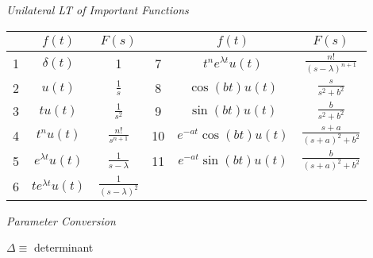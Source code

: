 \documentclass[twocolumn]{article}
\begin{document}
\vspace{-.5em}
\dotfill


\begin{table*}[h!]
    \centering
    \textit{Unilateral LT of Important Functions} \\[1em]

    \begin{tabular}{c| cc |c| cc}
        \toprule
        & $f(t)$ & $F(s)$ & & $f(t)$ & $F(s)$ \\
        \midrule
        1 & $\delta(t)$ & 1 & 7 & $t^n e^{\lambda t} u(t)$ & $\frac{n!}{(s-\lambda)^{n+1}}$ \\[1em]
        2 & $u(t)$ & $\frac{1}{s}$ & 8 & $\cos(bt) u(t)$ & $\frac{s}{s^2 + b^2}$ \\[1em]
        3 & $tu(t)$ & $\frac{1}{s^2}$ & 9 & $\sin(bt) u(t)$ & $\frac{b}{s^2+b^2}$ \\[1em]
        4 & $t^n u(t)$ & $\frac{n!}{s^{n+1}}$ & 10 & $e^{-at} \cos(bt) u(t)$ & $\frac{s+a}{(s+a)^2 + b^2}$ \\[1em]
        5 & $e^{\lambda t} u(t)$ & $\frac{1}{s-\lambda}$ & 11 & $e^{-at} \sin(bt) u(t)$ & $\frac{b}{(s+a)^2 + b^2}$ \\[1em]
        6 & $t e^{\lambda t} u(t)$ & $\frac{1}{(s-\lambda)^2}$ & \\[1em]
        \bottomrule
    \end{tabular}
\end{table*}


\cleardoublepage


\textit{Parameter Conversion}

$\Delta \equiv$ determinant
\end{document}
